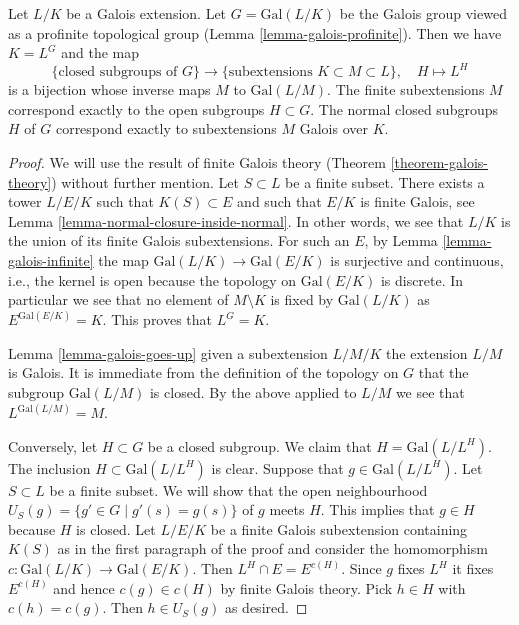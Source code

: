 \begin{theorem}
\label{theorem-inifinite-galois-theory}
Let $L/K$ be a Galois extension. Let $G = \text{Gal}(L/K)$
be the Galois group viewed as a profinite topological group
(Lemma \ref{lemma-galois-profinite}). Then we have $K = L^G$ and the map
$$
\{\text{closed subgroups of }G\}
\longrightarrow
\{\text{subextensions }K \subset M \subset L\},\quad
H \longmapsto L^H
$$
is a bijection whose inverse maps $M$ to $\text{Gal}(L/M)$.
The finite subextensions $M$ correspond exactly to the open
subgroups $H \subset G$. The normal closed subgroups $H$ of $G$
correspond exactly to subextensions $M$ Galois over $K$.
\end{theorem}

\begin{proof}
We will use the result of finite Galois theory
(Theorem \ref{theorem-galois-theory})
without further mention.
Let $S \subset L$ be a finite subset. There exists a tower
$L/E/K$ such that $K(S) \subset E$ and such that
$E/K$ is finite Galois, see Lemma \ref{lemma-normal-closure-inside-normal}.
In other words, we see that $L/K$ is the union of its finite
Galois subextensions.
For such an $E$, by Lemma \ref{lemma-galois-infinite}
the map $\text{Gal}(L/K) \to \text{Gal}(E/K)$ is surjective
and continuous, i.e., the kernel is open because the topology
on $\text{Gal}(E/K)$ is discrete.
In particular we see that no element of $M \setminus K$ is fixed by
$\text{Gal}(L/K)$ as $E^{\text{Gal}(E/K)} = K$.
This proves that $L^G = K$.

\medskip\noindent
Lemma \ref{lemma-galois-goes-up} given a subextension $L/M/K$
the extension $L/M$ is Galois. It is immediate from the definition
of the topology on $G$ that the subgroup $\text{Gal}(L/M)$ is closed.
By the above applied to $L/M$ we see that $L^{\text{Gal}(L/M)} = M$.

\medskip\noindent
Conversely, let $H \subset G$ be a closed subgroup. We claim that
$H = \text{Gal}(L/L^H)$. The inclusion $H \subset \text{Gal}(L/L^H)$
is clear. Suppose that $g \in \text{Gal}(L/L^H)$. Let $S \subset L$
be a finite subset. We will show that the open neighbourhood
$U_S(g) = \{g' \in G \mid g'(s) = g(s)\}$ of $g$ meets $H$.
This implies that $g \in H$ because $H$ is closed.
Let $L/E/K$ be a finite Galois subextension containing $K(S)$
as in the first paragraph of the proof and consider the homomorphism
$c : \text{Gal}(L/K) \to \text{Gal}(E/K)$.
Then $L^H \cap E = E^{c(H)}$. Since $g$ fixes $L^H$ it fixes
$E^{c(H)}$ and hence $c(g) \in c(H)$ by finite Galois theory.
Pick $h \in H$ with $c(h) = c(g)$. Then $h \in U_S(g)$ as desired.


\end{proof}
